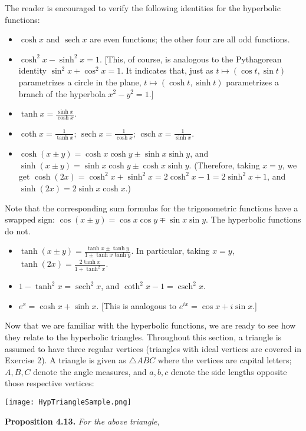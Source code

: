 \documentclass[leqno]{book}
\begin{document}
The reader is encouraged to verify the following identities for the hyperbolic functions:
\begin{itemize}
\item $\cosh x$ and $\operatorname{sech}x$ are even functions; the other four are all odd functions.

\item $\cosh^2x-\sinh^2x=1$.  [This, of course, is analogous to the Pythagorean identity $\sin^2x+\cos^2x=1$.  It indicates that, just as $t\mapsto(\cos t,\sin t)$ parametrizes a circle in the plane, $t\mapsto(\cosh t,\sinh t)$ parametrizes a branch of the hyperbola $x^2-y^2=1$.]

\item $\tanh x=\frac{\sinh x}{\cosh x}$.

\item $\coth x=\frac 1{\tanh x}$; $\operatorname{sech}x=\frac 1{\cosh x}$; $\operatorname{csch}x=\frac 1{\sinh x}$.

\item $\cosh(x\pm y)=\cosh x\cosh y\pm\sinh x\sinh y$, and $\sinh(x\pm y)=\sinh x\cosh y\pm\cosh x\sinh y$.  (Therefore, taking $x=y$, we get $\cosh(2x)=\cosh^2x+\sinh^2x=2\cosh^2x-1=2\sinh^2x+1$, and $\sinh(2x)=2\sinh x\cosh x$.)
\end{itemize}
Note that the corresponding sum formulas for the trigonometric functions have a swapped sign: $\cos(x\pm y)=\cos x\cos y\mp\sin x\sin y$.  The hyperbolic functions do not.
\begin{itemize}
\item $\tanh(x\pm y)=\frac{\tanh x\pm\tanh y}{1\pm\tanh x\tanh y}$.  In particular, taking $x=y$, $\tanh(2x)=\frac{2\tanh x}{1+\tanh^2x}$.

\item $1-\tanh^2x=\operatorname{sech}^2x$, and $\coth^2x-1=\operatorname{csch}^2x$.

\item $e^x=\cosh x+\sinh x$.  [This is analogous to $e^{ix}=\cos x+i\sin x$.]\\
\end{itemize}
\noindent Now that we are familiar with the hyperbolic functions, we are ready to see how they relate to the hyperbolic triangles.  Throughout this section, a triangle is assumed to have three regular vertices (triangles with ideal vertices are covered in Exercise 2).  A triangle is given as $\triangle ABC$ where the vertices are capital letters; $A,B,C$ denote the angle measures, and $a,b,c$ denote the side lengths opposite those respective vertices:
\begin{center}\texttt{[image: HypTriangleSample.png]}\end{center}
\noindent\textbf{Proposition 4.13.} \emph{For the above triangle,} %
\end{document}
